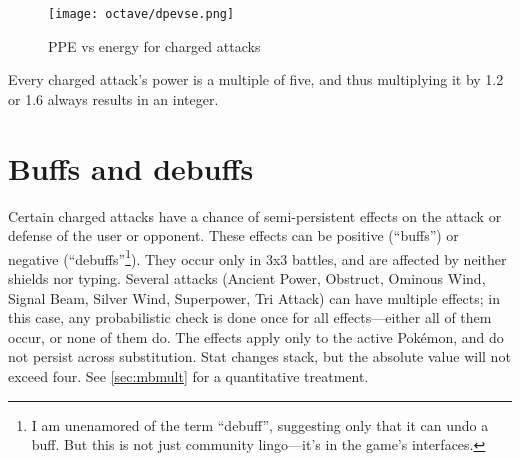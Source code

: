 \begin{figure}[ht]
\texttt{[image: octave/dpevse.png]}
  \caption{PPE vs energy for charged attacks\label{fig:dpevse}}
\end{figure}

\begin{tipbox}[title=Did you notice?]
Every charged attack's power is a multiple of five, and thus multiplying it by 1.2 or 1.6 always results in an integer.
\end{tipbox}

\section{Buffs and debuffs\label{sec:buffs}}
Certain charged attacks have a chance of semi-persistent effects on the
  attack or defense of the user or opponent.
These effects can be positive (``buffs'') or negative (``debuffs''\footnote{I am unenamored of the term ``debuff'',
  suggesting only that it can undo a buff. But this is not just community lingo---it's in the
  game's interfaces.}).
They occur only in 3x3 battles, and are affected by neither shields nor typing.
Several attacks (Ancient Power, Obstruct, Ominous Wind, Signal Beam, Silver
  Wind, Superpower, Tri Attack) can have multiple effects; in this case, any
  probabilistic check is done once for all effects---either all of them
  occur, or none of them do.
The effects apply only to the active Pokémon, and do not persist across substitution.
Stat changes stack, but the absolute value will not exceed four.
See \autoref{sec:mbmult} for a quantitative treatment.

